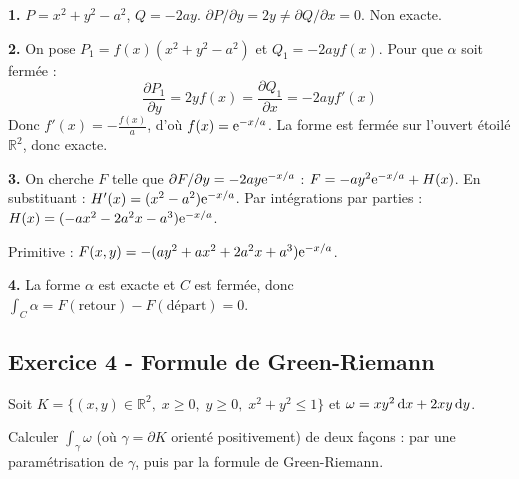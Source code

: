\documentclass[12pt,a4paper]{article}
\begin{document}
\begin{boitecorrige}
\textbf{1.} $P = x^2+y^2-a^2$, $Q=-2ay$. $\partial P/\partial y = 2y \neq \partial Q/\partial x = 0$. Non exacte.

\textbf{2.} On pose $P_1 = f(x)(x^2+y^2-a^2)$ et $Q_1 = -2ayf(x)$. Pour que $\alpha$ soit fermée :
\[
\frac{\partial P_1}{\partial y} = 2yf(x) = \frac{\partial Q_1}{\partial x} = -2ayf'(x)
\]
Donc $f'(x) = -\frac{f(x)}{a}$, d'où $f(x) = \mathrm{e}^{-x/a}$. La forme est fermée sur l'ouvert étoilé $\mathbb{R}^2$, donc exacte.

\textbf{3.} On cherche $F$ telle que $\partial F/\partial y = -2ay\mathrm{e}^{-x/a}$ : $F = -ay^2\mathrm{e}^{-x/a} + H(x)$. En substituant : $H'(x) = (x^2-a^2)\mathrm{e}^{-x/a}$. Par intégrations par parties : $H(x) = (-ax^2 - 2a^2x - a^3)\mathrm{e}^{-x/a}$.

Primitive : $F(x,y) = -(ay^2 + ax^2 + 2a^2x + a^3)\mathrm{e}^{-x/a}$.

\textbf{4.} La forme $\alpha$ est exacte et $C$ est fermée, donc $\int_C \alpha = F(\text{retour}) - F(\text{départ}) = 0$.
\end{boitecorrige}

\subsection*{Exercice 4 - Formule de Green-Riemann \niveau{\moyen}}

\begin{boiteexercice}
Soit $K = \{(x,y)\in\mathbb{R}^2,\;x\geq0,\;y\geq0,\;x^2+y^2\leq1\}$ et $\omega = xy^2\,\mathrm{d} x + 2xy\,\mathrm{d} y$.

Calculer $\int_\gamma \omega$ (où $\gamma = \partial K$ orienté positivement) de deux façons : par une paramétrisation de $\gamma$, puis par la formule de Green-Riemann.
\end{boiteexercice}
\end{document}
